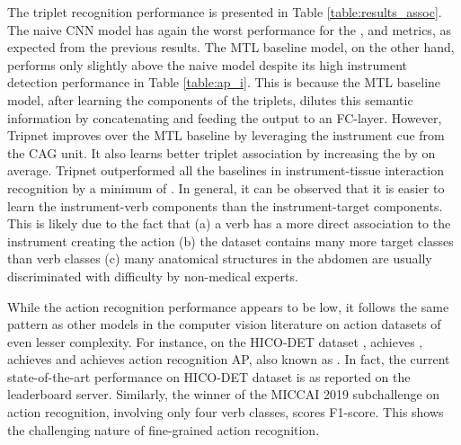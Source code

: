 \documentclass[english,runningheads,a4paper]{llncs}
\begin{document}
The triplet recognition performance is presented in Table \ref{table:results_assoc}. The naive CNN model has again the worst performance for the ,  and  metrics, as expected from the previous results. 
The MTL baseline model, on the other hand, performs only slightly above the naive model despite its high instrument detection performance in Table \ref{table:ap_i}. 
This is because the MTL baseline model, after learning the components of the triplets, dilutes this semantic information by concatenating and feeding the output to an FC-layer. However, Tripnet improves over the MTL baseline by leveraging the instrument cue from the CAG unit. It also learns better triplet association by increasing the  by  on average. Tripnet outperformed all the baselines in instrument-tissue interaction recognition by a minimum of . In general, it can be observed that it is easier to learn the instrument-verb components than the instrument-target components. This is likely due to the fact that 
(a) a verb has a more direct association to the instrument creating the action 
(b) the dataset contains many more target classes than verb classes 
(c) many anatomical structures in the abdomen are usually discriminated with difficulty by non-medical experts.

While the action recognition performance appears to be low, it follows the same pattern as other models in the computer vision literature on action datasets of even lesser complexity. For instance, on the HICO-DET dataset \cite{chao_hoi_wacv2018}, \cite{gkioxari_hoi_cvpr2018} achieves , \cite{qi_hoi_eccv2018} achieves  and \cite{xu_hoi_cvpr2019} achieves  action recognition AP, also known as . In fact, the current state-of-the-art performance on HICO-DET dataset is  as reported on the leaderboard server. Similarly, the winner of the MICCAI 2019 subchallenge on action recognition, involving only four verb classes, scores  F1-score. This shows the challenging nature of fine-grained action recognition.
\end{document}
